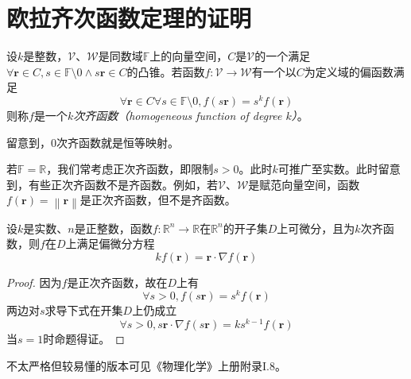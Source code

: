 \documentclass[main.tex]{subfiles}
\begin{document}
\section{欧拉齐次函数定理的证明}\label{sec:A.1_Euler_theorem_homogeneous_function}
\begin{definition}
  设$k$是整数，$\mathcal{V}$、$\mathcal{W}$是同数域$\mathbb{F}$上的向量空间，$C$是$\mathcal{V}$的一个满足$\forall\mathbf{r}\in C,s\in\mathbb{F}\setminus 0\wedge s\mathbf{r}\in C$的凸锥。若函数$f:\mathcal{V}\rightarrow\mathcal{W}$有一个以$C$为定义域的偏函数满足
  \[
    \forall \mathbf{r}\in C\forall s\in\mathbb{F}\setminus 0,f\left(s\mathbf{r}\right)=s^kf\left(\mathbf{r}\right)
  \]
  则称$f$是一个\emph{$k$次齐函数（homogeneous function of degree $k$）}。
\end{definition}

留意到，0次齐函数就是恒等映射。

若$\mathbb{F}=\mathbb{R}$，我们常考虑正次齐函数，即限制$s>0$。此时$k$可推广至实数。此时留意到，有些正次齐函数不是齐函数。例如，若$\mathcal{V}$、$\mathcal{W}$是赋范向量空间，函数$f\left(\mathbf{r}\right)=\left\|\mathbf{r}\right\|$是正次齐函数，但不是齐函数。

\begin{theorem}[齐函数的欧拉定理]\label{thm:Euler_theorem_for_homogeneous_function}
  设$k$是实数、$n$是正整数，函数$f:\mathbb{R}^n\rightarrow\mathbb{R}$在$\mathbb{R}^n$的开子集$D$上可微分，且为$k$次齐函数，则$f$在$D$上满足偏微分方程
  \[kf\left(\mathbf{r}\right)=\mathbf{r}\cdot\nabla f\left(\mathbf{r}\right)\]
\end{theorem}
\begin{proof}
  因为$f$是正次齐函数，故在$D$上有
  \[\forall s>0,f\left(s\mathbf{r}\right)=s^kf\left(\mathbf{r}\right)\]
  两边对$s$求导下式在开集$D$上仍成立
  \[\forall s>0,s\mathbf{r}\cdot\nabla f\left(s\mathbf{r}\right)=ks^{k-1}f\left(\mathbf{r}\right)\]
  当$s=1$时命题得证。
\end{proof}

不太严格但较易懂的版本可见《物理化学》上册附录I.8。
\end{document}
